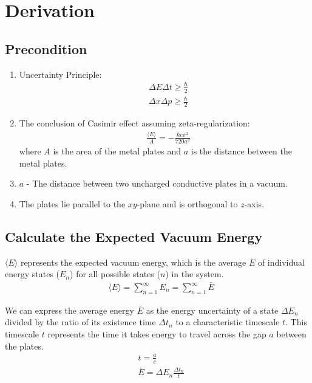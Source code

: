 \section{Derivation}


\subsection*{Precondition}
\begin{enumerate}
    \item Uncertainty Principle\citep*{heisenberg1930physical}:
    \begin{align}
        &\Delta E \Delta t \ge \frac{\hbar}{2}\\
        &\Delta x \Delta p \ge \frac{\hbar}{2}
    \end{align}
    \item The conclusion of Casimir effect assuming zeta-regularization\citep*{Casimir:1948dh}: 
    \begin{align}&\frac{\langle E \rangle}{A} = -\frac{\hbar c \pi^2}{720 a^3}\end{align}
    where \(A\) is the area of the metal plates and $a$ is the distance between the metal plates.
    \item $a$ - The distance between two uncharged conductive plates in a vacuum.
    \item The plates lie parallel to the \(xy\)-plane and is orthogonal to \(z\)-axis.
\end{enumerate}

\subsection*{Calculate the Expected Vacuum Energy}

$\langle E \rangle$ represents the expected vacuum energy, 
which is the average $\bar E$ of individual energy states ($E_n$) for all possible states ($n$) in the system.
\begin{align}
    &\langle E \rangle = \sum_{n=1}^{\infty}E_n = \sum_{n=1}^{\infty}\bar{E}
\end{align}

We can express the average energy $\bar E$ as the energy uncertainty of 
a state $\Delta E_n$ divided by the ratio of its existence time $\Delta t_n$ 
to a characteristic timescale $t$.
This timescale $t$ represents the time it takes energy to travel across the gap $a$ between the plates.
\begin{align}
    &t = \frac{a}{c} \\
    &\bar{E} = \Delta E_n\frac{\Delta t_n}{t}
\end{align}

